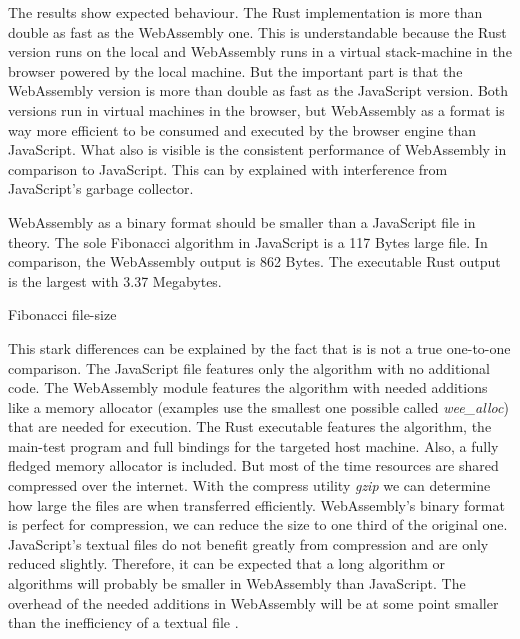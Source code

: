The results show expected behaviour. The Rust implementation is more than double as fast as the WebAssembly one. This is understandable because the Rust version runs on the local and WebAssembly runs in a virtual stack-machine in the browser powered by the local machine. But the important part is that the WebAssembly version is more than double as fast as the JavaScript version. Both versions run in virtual machines in the browser, but WebAssembly as a format is way more efficient to be consumed and executed by the browser engine than JavaScript. What also is visible is the consistent performance of WebAssembly in comparison to JavaScript. This can by explained with interference from JavaScript's garbage collector.  

WebAssembly as a binary format should be smaller than a JavaScript file in theory. The sole Fibonacci algorithm in JavaScript is a 117 Bytes large file. In comparison, the WebAssembly output is 862 Bytes. The executable Rust output is the largest with 3.37 Megabytes.

\begin{listing}
\begin{center}
\end{center}
\caption{Fibonacci file-size}
\label{lst:fibonacci-filesize}
\end{listing}

This stark differences can be explained by the fact that is is not a true one-to-one comparison. The JavaScript file features only the algorithm with no additional code. The WebAssembly module features the algorithm with needed additions like a memory allocator (examples use the smallest one possible called \textit{wee\_alloc}) that are needed for execution. The Rust executable features the algorithm, the main-test program and full bindings for the targeted host machine. Also, a fully fledged memory allocator is included. But most of the time resources are shared compressed over the internet. With the compress utility \textit{gzip} we can determine how large the files are when transferred efficiently. WebAssembly's binary format is perfect for compression, we can reduce the size to one third of the original one. JavaScript's textual files do not benefit greatly from compression and are only reduced slightly. Therefore, it can be expected that a long algorithm or algorithms will probably be smaller in WebAssembly than JavaScript. The overhead of the needed additions in WebAssembly will be at some point smaller than the inefficiency of a textual file \cite{wasm:allocator, rust:wasmfilesize}.

